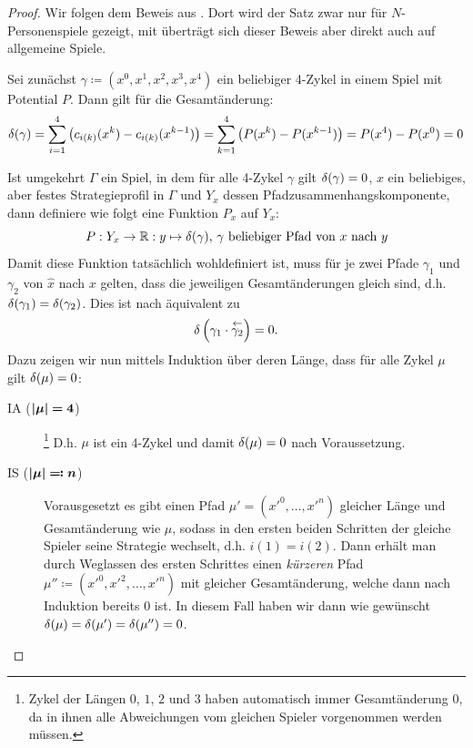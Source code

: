 \begin{proof}
	Wir folgen dem Beweis aus \cite[Anhang A]{MonShap}. Dort wird der Satz zwar nur für $N$-Personenspiele gezeigt, mit  überträgt sich dieser Beweis aber direkt auch auf allgemeine Spiele.
	
	Sei zunächst $\gamma \coloneqq (x^0, x^1, x^2, x^3, x^4)$ ein beliebiger 4-Zykel in einem Spiel mit Potential $P$. Dann gilt für die Gesamtänderung:
		\[\delta(\gamma) = \sum_{i=1}^4 \left(c_{i(k)}(x^k) - c_{i(k)}(x^{k-1})\right) = \sum_{k=1}^{4} \left(P(x^k) - P(x^{k-1})\right) = P(x^4) - P(x^0) = 0^{}\]
		
	Ist umgekehrt $\Gamma$ ein Spiel, in dem für alle 4-Zykel $\gamma$ gilt $\delta(\gamma) = 0$, $x$ ein beliebiges, aber festes Strategieprofil in $\Gamma$ und $Y_x$ dessen Pfadzusammenhangskomponente, dann definiere wie folgt eine Funktion $P_x$ auf $Y_x$:
		\[P: Y_x \to \mathbb{R}: y \mapsto \delta(\gamma), \,\gamma \text{ beliebiger Pfad von } x \text{ nach } y \]
	Damit diese Funktion tatsächlich wohldefiniert ist, muss für je zwei Pfade $\gamma_1$ und $\gamma_2$ von $\hat{x}$ nach $x$ gelten, dass die jeweiligen Gesamtänderungen gleich sind, d.h. $\delta(\gamma_1) = \delta(\gamma_2)$. Dies ist nach  äquivalent zu
		\[\delta\left(\gamma_1 \cdot \overset{\leftarrow}{\gamma_2}\right) = 0.\]
	Dazu zeigen wir nun mittels Induktion über deren Länge, dass für alle Zykel $\mu$ gilt $\delta(\mu) = 0$:
	\begin{description}
		\item[IA ($\bm{\left|\mu\right|=4}$)]\hspace{-.5em}\footnote{Zykel der Längen $0$, $1$, $2$ und $3$ haben automatisch immer Gesamtänderung $0$, da in ihnen alle Abweichungen vom gleichen Spieler vorgenommen werden müssen.} D.h. $\mu$ ist ein 4-Zykel und damit $\delta(\mu) = 0$ nach Voraussetzung.
		\item[IS ($\bm{\left|\mu\right|\eqqcolon n}$)] Vorausgesetzt es gibt einen Pfad $\mu' = (x'^0, \dots, x'^n)$ gleicher Länge und Gesamtänderung wie $\mu$, sodass in den ersten beiden Schritten der gleiche Spieler seine Strategie wechselt, d.h. $i(1)=i(2)$. Dann erhält man durch Weglassen des ersten Schrittes einen \emph{kürzeren} Pfad $\mu'' \coloneqq (x'^0, x'^2, \dots, x'^n)$ mit gleicher Gesamtänderung, welche dann nach Induktion bereits $0$ ist. In diesem Fall haben wir dann wie gewünscht $\delta(\mu) = \delta(\mu') = \delta(\mu'') = 0$.
		

\end{description}
\end{proof}
